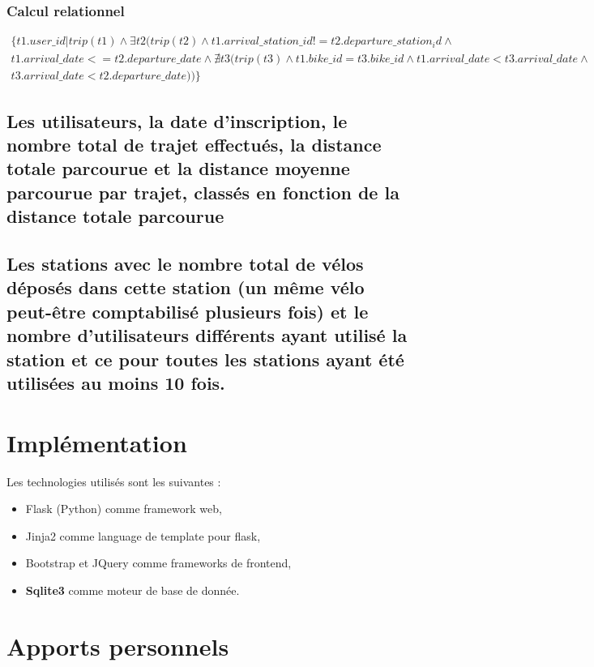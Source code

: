 \documentclass[a4paper,10pt]{article}
\begin{document}
\subsubsection{Calcul relationnel}
\begin{align}
	\{ t1.user\_id | trip(t1) \wedge \exists t2 (trip(t2) \wedge t1.arrival\_station\_id != t2.departure\_station_id \wedge \\ t1.arrival\_date <= t2.departure\_date  \wedge \nexists t3 (trip(t3) \wedge t1.bike\_id = t3.bike\_id \wedge t1.arrival\_date < t3.arrival\_date \wedge \\ t3.arrival\_date < t2.departure\_date)) \}
\end{align}


\subsection{Les utilisateurs, la date d'inscription, le nombre total de trajet effectués, la distance totale parcourue et la distance moyenne parcourue par trajet, classés en fonction de la distance totale parcourue}


\subsection{Les stations avec le nombre total de vélos déposés dans cette station (un même vélo peut-être comptabilisé plusieurs fois) et le nombre d'utilisateurs différents ayant utilisé la station et ce pour toutes les stations ayant été utilisées au moins 10 fois.}


\section{Implémentation}
Les technologies utilisés sont les suivantes :
\begin{itemize}
	\item Flask (Python) comme framework web,
	\item Jinja2 comme language de template pour flask,
	\item Bootstrap et JQuery comme frameworks de frontend,
	\item \textbf{Sqlite3} comme moteur de base de donnée.
\end{itemize}

\section{Apports personnels}
\end{document}
